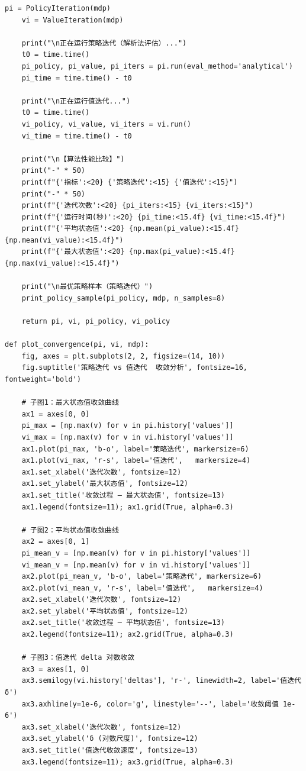 \documentclass[12pt,a4paper]{article}
\begin{document}
\begin{lstlisting}[caption={策略迭代与值迭代算法完整实现（3.py）}]
    pi = PolicyIteration(mdp)
    vi = ValueIteration(mdp)

    print("\n正在运行策略迭代（解析法评估）...")
    t0 = time.time()
    pi_policy, pi_value, pi_iters = pi.run(eval_method='analytical')
    pi_time = time.time() - t0

    print("\n正在运行值迭代...")
    t0 = time.time()
    vi_policy, vi_value, vi_iters = vi.run()
    vi_time = time.time() - t0

    print("\n【算法性能比较】")
    print("-" * 50)
    print(f"{'指标':<20} {'策略迭代':<15} {'值迭代':<15}")
    print("-" * 50)
    print(f"{'迭代次数':<20} {pi_iters:<15} {vi_iters:<15}")
    print(f"{'运行时间(秒)':<20} {pi_time:<15.4f} {vi_time:<15.4f}")
    print(f"{'平均状态值':<20} {np.mean(pi_value):<15.4f} {np.mean(vi_value):<15.4f}")
    print(f"{'最大状态值':<20} {np.max(pi_value):<15.4f} {np.max(vi_value):<15.4f}")

    print("\n最优策略样本（策略迭代）")
    print_policy_sample(pi_policy, mdp, n_samples=8)

    return pi, vi, pi_policy, vi_policy

def plot_convergence(pi, vi, mdp):
    fig, axes = plt.subplots(2, 2, figsize=(14, 10))
    fig.suptitle('策略迭代 vs 值迭代  收敛分析', fontsize=16, fontweight='bold')

    # 子图1：最大状态值收敛曲线
    ax1 = axes[0, 0]
    pi_max = [np.max(v) for v in pi.history['values']]
    vi_max = [np.max(v) for v in vi.history['values']]
    ax1.plot(pi_max, 'b-o', label='策略迭代', markersize=6)
    ax1.plot(vi_max, 'r-s', label='值迭代',   markersize=4)
    ax1.set_xlabel('迭代次数', fontsize=12)
    ax1.set_ylabel('最大状态值', fontsize=12)
    ax1.set_title('收敛过程 — 最大状态值', fontsize=13)
    ax1.legend(fontsize=11); ax1.grid(True, alpha=0.3)

    # 子图2：平均状态值收敛曲线
    ax2 = axes[0, 1]
    pi_mean_v = [np.mean(v) for v in pi.history['values']]
    vi_mean_v = [np.mean(v) for v in vi.history['values']]
    ax2.plot(pi_mean_v, 'b-o', label='策略迭代', markersize=6)
    ax2.plot(vi_mean_v, 'r-s', label='值迭代',   markersize=4)
    ax2.set_xlabel('迭代次数', fontsize=12)
    ax2.set_ylabel('平均状态值', fontsize=12)
    ax2.set_title('收敛过程 — 平均状态值', fontsize=13)
    ax2.legend(fontsize=11); ax2.grid(True, alpha=0.3)

    # 子图3：值迭代 delta 对数收敛
    ax3 = axes[1, 0]
    ax3.semilogy(vi.history['deltas'], 'r-', linewidth=2, label='值迭代 δ')
    ax3.axhline(y=1e-6, color='g', linestyle='--', label='收敛阈值 1e-6')
    ax3.set_xlabel('迭代次数', fontsize=12)
    ax3.set_ylabel('δ (对数尺度)', fontsize=12)
    ax3.set_title('值迭代收敛速度', fontsize=13)
    ax3.legend(fontsize=11); ax3.grid(True, alpha=0.3)


\end{lstlisting}
\end{document}
